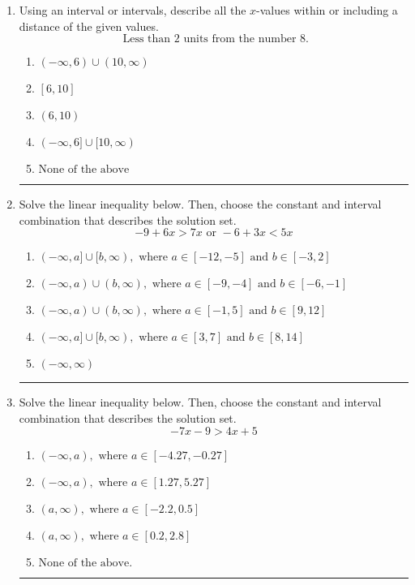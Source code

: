 \documentclass[14pt]{extbook}
\newcommand{\litem}[1]{\item#1\hspace*{-1cm}\rule{\textwidth}{0.4pt}}
\begin{document}
\begin{enumerate}
{\begin{enumerate}[label=\Alph*.]
\end{enumerate} }
\litem{
Using an interval or intervals, describe all the $x$-values within or including a distance of the given values.\[ \text{ Less than } 2 \text{ units from the number } 8. \]\begin{enumerate}[label=\Alph*.]
\item \( (-\infty, 6) \cup (10, \infty) \)
\item \( [6, 10] \)
\item \( (6, 10) \)
\item \( (-\infty, 6] \cup [10, \infty) \)
\item \( \text{None of the above} \)

\end{enumerate} }
\litem{
Solve the linear inequality below. Then, choose the constant and interval combination that describes the solution set.\[ -9 + 6 x > 7 x \text{ or } -6 + 3 x < 5 x \]\begin{enumerate}[label=\Alph*.]
\item \( (-\infty, a] \cup [b, \infty), \text{ where } a \in [-12, -5] \text{ and } b \in [-3, 2] \)
\item \( (-\infty, a) \cup (b, \infty), \text{ where } a \in [-9, -4] \text{ and } b \in [-6, -1] \)
\item \( (-\infty, a) \cup (b, \infty), \text{ where } a \in [-1, 5] \text{ and } b \in [9, 12] \)
\item \( (-\infty, a] \cup [b, \infty), \text{ where } a \in [3, 7] \text{ and } b \in [8, 14] \)
\item \( (-\infty, \infty) \)

\end{enumerate} }
\litem{
Solve the linear inequality below. Then, choose the constant and interval combination that describes the solution set.\[ -7x -9 > 4x + 5 \]\begin{enumerate}[label=\Alph*.]
\item \( (-\infty, a), \text{ where } a \in [-4.27, -0.27] \)
\item \( (-\infty, a), \text{ where } a \in [1.27, 5.27] \)
\item \( (a, \infty), \text{ where } a \in [-2.2, 0.5] \)
\item \( (a, \infty), \text{ where } a \in [0.2, 2.8] \)
\item \( \text{None of the above}. \)


\end{enumerate}}
\end{enumerate}
\end{document}
